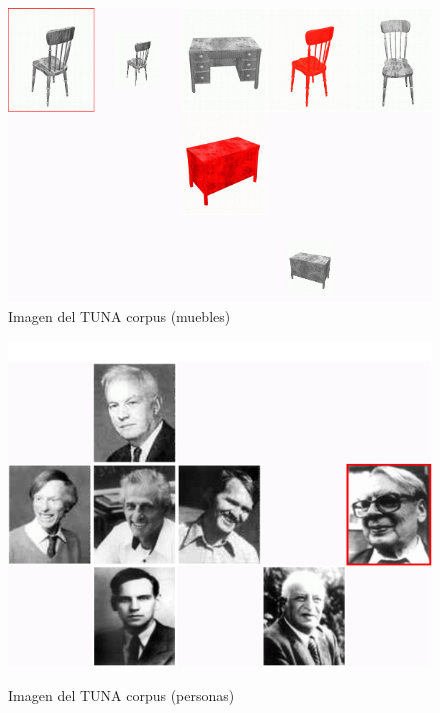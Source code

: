 \begin{figure}
\begin{minipage}[t]{0.5\linewidth}
\centering
\includegraphics[width=\textwidth]{images/largeGreyChair.jpg}\\[0pt]
\caption{Imagen del TUNA corpus (muebles)}
\label{fig-TUNA-furniture}
\vspace*{.1cm}
\end{minipage}
\hspace*{0cm}
\begin{minipage}[t]{0.5\linewidth}
\centering
\includegraphics[width=\textwidth]{images/tuna-people.jpg}\\[0pt]
\caption{Imagen del TUNA corpus (personas)}
\label{fig-TUNA-people}
\end{minipage}
\end{figure}


